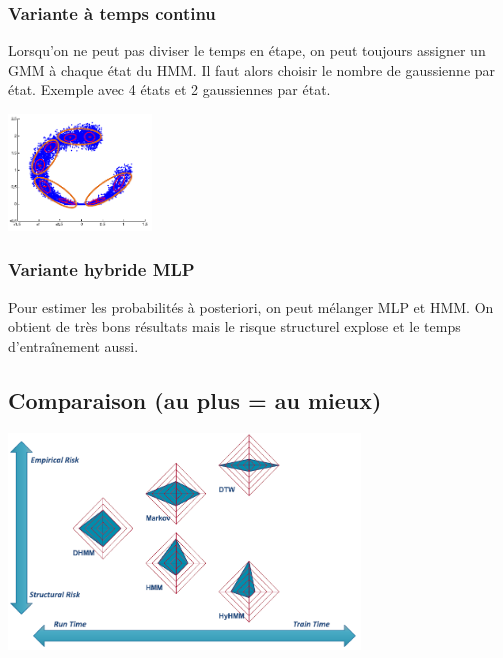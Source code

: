 \documentclass[letterpaper, 12pt]{article}
\newcommand{\alinea}{
\hspace*{0.5cm}}
\begin{document}
			\subsubsection{Variante à temps continu}
				\begin{minipage}{0.69\textwidth}
					\alinea Lorsqu'on ne peut pas diviser le temps en étape, on peut toujours assigner un GMM à chaque état du HMM.
						Il faut alors choisir le nombre de gaussienne par état. Exemple avec 4 états et 2 gaussiennes par état.
				\end{minipage}\hfill
				\begin{minipage}{0.3\textwidth}
					\begin{center}
						\includegraphics[width=1.5in]{Images/hmm3}
					\end{center}
				\end{minipage}
			\subsubsection{Variante hybride MLP}
				\alinea Pour estimer les probabilités à posteriori, on peut mélanger MLP et HMM. On obtient de très bons résultats
					mais le risque structurel explose et le temps d'entraînement aussi.	
		\subsection{Comparaison (au plus = au mieux)}
			\begin{center}
				\includegraphics[width=0.7\textwidth]{Images/comp}
			\end{center}
%
\end{document}
